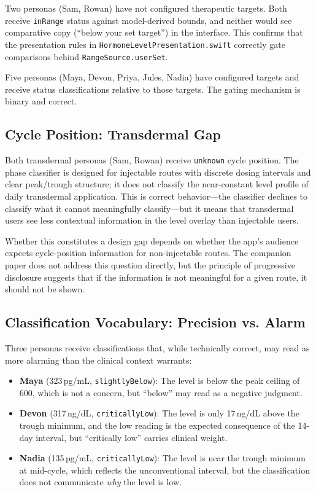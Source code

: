 \documentclass[11pt,a4paper]{article}
\newcommand{\code}[1]{\texttt{\small #1}}
\begin{document}
Two personas (Sam, Rowan) have not configured therapeutic targets. Both
receive \code{inRange} status against model-derived bounds, and neither
would see comparative copy (``below your set target'') in the interface.
This confirms that the presentation rules in
\code{HormoneLevelPresentation.swift} correctly gate comparisons behind
\code{RangeSource.userSet}.

Five personas (Maya, Devon, Priya, Jules, Nadia) have configured targets and
receive status classifications relative to those targets. The gating
mechanism is binary and correct.

\subsection{Cycle Position: Transdermal Gap}

Both transdermal personas (Sam, Rowan) receive \code{unknown} cycle
position. The phase classifier is designed for injectable routes with
discrete dosing intervals and clear peak/trough structure; it does not
classify the near-constant level profile of daily transdermal application.
This is correct behavior---the classifier declines to classify what it
cannot meaningfully classify---but it means that transdermal users see less
contextual information in the level overlay than injectable users.

Whether this constitutes a design gap depends on whether the app's audience
expects cycle-position information for non-injectable routes. The companion
paper does not address this question directly, but the principle of
progressive disclosure suggests that if the information is not meaningful
for a given route, it should not be shown.

\subsection{Classification Vocabulary: Precision vs. Alarm}

Three personas receive classifications that, while technically correct, may
read as more alarming than the clinical context warrants:

\begin{itemize}[nosep,leftmargin=1.4em]
\item \textbf{Maya} (323\,pg/mL, \code{slightlyBelow}): The level is below
  the peak ceiling of 600, which is not a concern, but ``below'' may read as
  a negative judgment.
\item \textbf{Devon} (317\,ng/dL, \code{criticallyLow}): The level is only
  17\,ng/dL above the trough minimum, and the low reading is the expected
  consequence of the 14-day interval, but ``critically low'' carries
  clinical weight.
\item \textbf{Nadia} (135\,pg/mL, \code{criticallyLow}): The level is near
  the trough minimum at mid-cycle, which reflects the unconventional
  interval, but the classification does not communicate \emph{why} the level
  is low.
\end{itemize}
\end{document}
